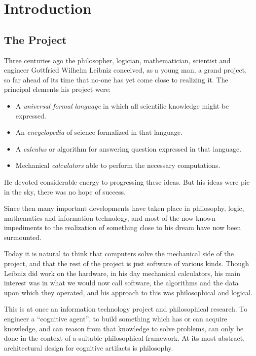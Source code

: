 \chapter{Introduction}\label{Introduction}

\section{The Project}

Three centuries ago the philosopher, logician, mathematician,
scientist and engineer Gottfried Wilhelm Leibniz conceived, as a young
man, a grand project, so far ahead of its time that no-one has yet
come close to realizing it.
The principal elements his project were:
\begin{itemize}
\item A \emph{universal formal language} in which all scientific
  knowledge might be expressed.
\item An \emph{encyclopedia} of science formalized in that language.
\item A \emph{calculus} or algorithm for answering question expressed
  in that language.
\item Mechanical \emph{calculators} able to perform the necessary computations.
\end{itemize}

He devoted considerable energy to progressing these ideas.
But his ideas were pie in the sky, there was no hope of success.

Since then many important developments have taken place in philosophy,
logic, mathematics and information technology, and most of the now known
impediments to the realization of something close to his dream have
now been surmounted.

Today it is natural to think that computers solve the mechanical side
of the project, and that the rest of the project is just software of
various kinds.
Though Leibniz did work on the hardware, in his day mechanical
calculators, his main interest was in what we would now call software,
the algorithms and the data upon which they operated, and his approach
to this was philosophical and logical.
 
This is at once an information technology project and philosophical research.
To engineer a ``cognitive agent'', to build something which has or can
acquire knowledge, and can reason from that knowledge to solve
problems, can only be done in the context of a suitable philosophical
framework.
At its most abstract, architectural design for cognitive artifacts is
philosophy.

